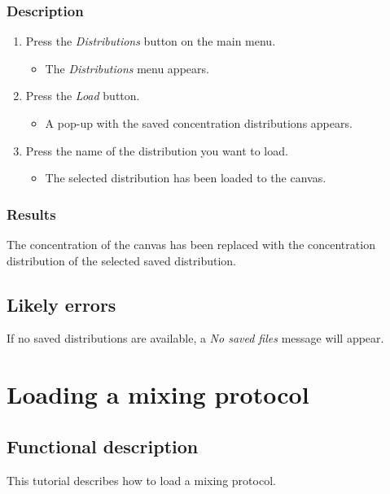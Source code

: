 \subsubsection{Description}
\begin{enumerate}
	\item Press the \emph{Distributions} button on the main menu.
		\begin{itemize}
            \item The \emph{Distributions} menu appears.
		\end{itemize}
	\item Press the \emph{Load} button.
		\begin{itemize}
            \item  A pop-up with the saved concentration distributions appears.
		\end{itemize}
    \item Press the name of the distribution you want to load.
		\begin{itemize}
           \item The selected distribution has been loaded to the canvas.
		\end{itemize}
\end{enumerate}

\subsubsection{Results}
The concentration of the canvas has been replaced with the concentration distribution of the selected saved distribution.

\subsection{Likely errors}
If no saved distributions are available, a \emph{No saved files} message will appear.


\section{Loading a mixing protocol}
\label{sec:loadMixProt}

\subsection{Functional description}
This tutorial describes how to load a mixing protocol.

